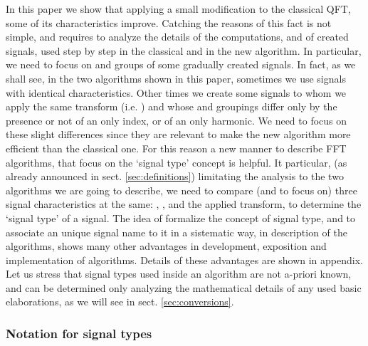 \documentclass[a4paper,10pt]{article}
\begin{document}
In this paper we show that applying a small modification to the classical QFT, some of its characteristics improve.
Catching the reasons of this fact is not simple, and requires to analyze the details of the computations, and of created signals, used step by step in the classical and in the new algorithm. 
In particular, we need to focus on  and  groups of some gradually created signals.
In fact, as we shall see, in the two algorithms shown in this paper, sometimes we use signals with identical characteristics. 
Other times we create some signals to whom we apply the same transform (i.e. ) and whose  and  groupings differ only by the presence or not of an only  index, or of an only  harmonic.
We need to focus on these slight differences since they are relevant to make the new algorithm more efficient than the classical one.
For this reason a new manner to describe FFT algorithms, that focus on the `signal type' concept is helpful.
It particular, (as already announced in sect. \ref{sec:definitions}) limitating the analysis to the two algorithms we are going to describe, we need to compare (and to focus on) three signal characteristics at the same: ,  , and the applied transform, to determine the `signal type' of a signal.
The idea of formalize the concept of signal type, and to associate an unique signal name to it in a sistematic way, in description of the algorithms, shows many other advantages in development, exposition and implementation of algorithms. 
Details of these advantages are shown in appendix.
Let us stress that signal types used inside an algorithm are not a-priori known, and can be determined only analyzing the mathematical details of any used basic elaborations, as we will see in sect. \ref{sec:conversions}.



\subsubsection{Notation for signal types } \label{sec:notation_sub}
\end{document}
